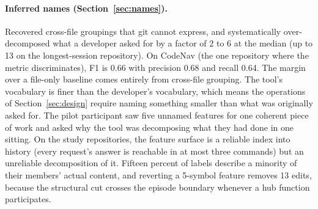 \begin{figure}[t]
  \centering
  
  \caption{\FigSixCaption}
  \Description{\FigSixDescription}
  \label{fig:fork-cost}
\end{figure}

\paragraph{Inferred names (Section~\ref{sec:names}).}
Recovered cross-file groupings that git cannot express, and systematically
over-decomposed what a developer asked for by a factor of 2 to 6 at the median
(up to 13 on the longest-session repository). On
CodeNav (the one repository where the metric discriminates), F1 is 0.66 with
precision 0.68 and recall 0.64. The margin over a file-only baseline comes
entirely from cross-file grouping. The tool's vocabulary is finer than the
developer's vocabulary, which means the operations of
Section~\ref{sec:design} require naming something smaller than what was
originally asked for. The pilot participant saw five unnamed features for one
coherent piece of work and asked why the tool was decomposing what they had done
in one sitting. On the study repositories, the feature surface is a reliable
index into history (every request's answer is reachable in at most three
commands) but an unreliable decomposition of it. Fifteen percent of labels
describe a minority of their members' actual content, and reverting a 5-symbol
feature removes 13 edits, because the structural cut crosses the episode
boundary whenever a hub function participates.

